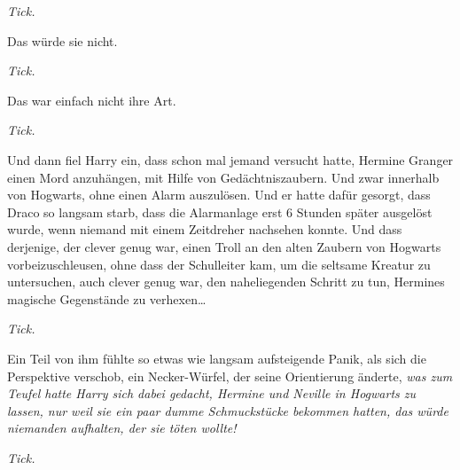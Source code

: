 \emph{Tick.}

Das würde sie nicht.

\emph{Tick.}

Das war einfach nicht ihre Art.

\emph{Tick.}

Und dann fiel Harry ein, dass schon mal jemand versucht hatte, Hermine Granger einen Mord anzuhängen, mit Hilfe von Gedächtniszaubern. Und zwar innerhalb von Hogwarts, ohne einen Alarm auszulösen. Und er hatte dafür gesorgt, dass Draco so langsam starb, dass die Alarmanlage erst 6 Stunden später ausgelöst wurde, wenn niemand mit einem Zeitdreher nachsehen konnte. Und dass derjenige, der clever genug war, einen Troll an den alten Zaubern von Hogwarts vorbeizuschleusen, ohne dass der Schulleiter kam, um die seltsame Kreatur zu untersuchen, auch clever genug war, den naheliegenden Schritt zu tun, Hermines magische Gegenstände zu verhexen…

\emph{Tick.}

Ein Teil von ihm fühlte so etwas wie langsam aufsteigende Panik, als sich die Perspektive verschob, ein Necker-Würfel, der seine Orientierung änderte, \emph{was zum Teufel hatte Harry sich dabei gedacht, Hermine und Neville in Hogwarts zu lassen, nur weil sie ein paar dumme Schmuckstücke bekommen hatten, das würde niemanden aufhalten, der sie töten wollte!}

\emph{Tick.}

